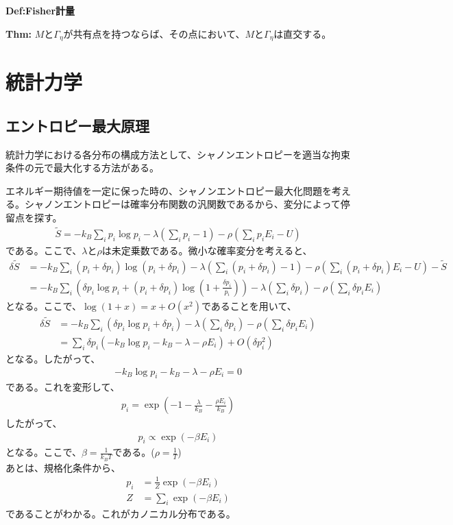 \documentclass[a4paper,11pt]{jsarticle}
\numberwithin{equation}{section}
\begin{document}
\begin{itembox}[l]{\textbf{Def:Fisher計量}}
\begin{itembox}[l]{\textbf{Thm:}}
    $M$と$\Gamma_{\eta}$が共有点を持つならば、その点において、$M$と$\Gamma_{\eta}$は直交する。
\end{itembox}


\section{統計力学}
\subsection{エントロピー最大原理}
統計力学における各分布の構成方法として、シャノンエントロピーを適当な拘束条件の元で最大化する方法がある。

エネルギー期待値を一定に保った時の、シャノンエントロピー最大化問題を考える。シャノンエントロピーは確率分布関数の汎関数であるから、変分によって停留点を探す。
\begin{align}
  \tilde{S}= -k_B\sum_{i}p_i\log p_i -\lambda\left(\sum_{i}p_i - 1\right)-\rho\left(\sum_{i}p_iE_i - U\right)  
\end{align}
である。ここで、$\lambda$と$\rho$は未定乗数である。微小な確率変分を考えると、
\begin{align}
  \delta \tilde{S} &= -k_B\sum_{i}(p_i + \delta p_i)\log (p_i + \delta p_i) -\lambda\left(\sum_{i}(p_i + \delta p_i)- 1\right) -\rho\left(\sum_{i}(p_i + \delta p_i)E_i - U\right)-\tilde{S}\\
  &= -k_B\sum_{i}\left(\delta p_i\log p_i + (p_i + \delta p_i)\log \left(1 + \frac{\delta p_i}{p_i}\right)\right)  -\lambda\left(\sum_{i}\delta p_i\right)-\rho\left(\sum_{i}\delta p_iE_i\right)
\end{align}
となる。ここで、$\log(1+x) = x + O(x^2)$であることを用いて、
\begin{align}
  \delta \tilde{S} &= -k_B\sum_{i}\left(\delta p_i\log p_i + \delta p_i\right)  -\lambda\left(\sum_{i}\delta p_i\right)-\rho\left(\sum_{i}\delta p_iE_i\right)\\
  &= \sum_{i}\delta p_i\left(-k_B\log p_i - k_B - \lambda - \rho E_i\right) + O(\delta p_i^2)
\end{align}
となる。したがって、
\begin{align}
  -k_B\log p_i - k_B - \lambda - \rho E_i = 0
\end{align}
である。これを変形して、
\begin{align}
  p_i = \exp(-1-\frac{\lambda}{k_B}-\frac{\rho E_i}{k_B})
\end{align}
したがって、
\begin{align}
  p_i \propto \exp(-\beta E_i)
\end{align}
となる。ここで、$\beta = \frac{1}{k_B T}$である。($\rho = \frac{1}{T}$)\\
あとは、規格化条件から、
\begin{align}
    p_i &= \frac{1}{Z} \exp(-\beta E_i)\\
    Z &= \sum_{i} \exp(-\beta E_i)
\end{align}
であることがわかる。これがカノニカル分布である。\\


\end{itembox}
\end{document}
